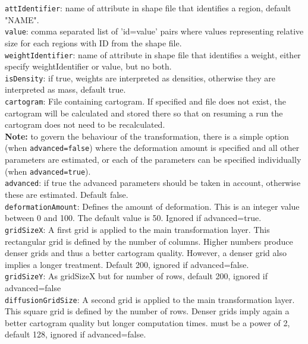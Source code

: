 \documentclass{article}
\begin{document}
{\tt attIdentifier}: name of attribute in shape file that identifies a region, default "NAME".\\

{\tt value}: comma separated list of 'id=value' pairs where values representing relative size for each regions with ID from the shape file.\\

{\tt weightIdentifier}: name of attribute in shape file that identifies a weight, either specify weightIdentifier or value, but no both.\\

{\tt isDensity}: if true, weights are interpreted as densities, otherwise they are interpreted as mass, default true.\\

{\tt cartogram}: File containing cartogram. If specified and file does not exist, the cartogram will be calculated and stored there so that on resuming a run the cartogram does not need to be recalculated.\\

{\bf Note:} to govern the behaviour of the transformation, there is a simple option (when {\tt advanced=false}) where the deformation amount is specified and all other parameters are estimated, or each of the parameters can be specified individually (when {\tt advanced=true}).\\

{\tt advanced}: if true the advanced parameters should be taken in account, otherwise these are estimated. Default false.\\

{\tt deformationAmount}: Defines the amount of deformation. This is an integer value between 0 and 100. The default value is 50. Ignored if advanced=true.\\

{\tt gridSizeX}: A first grid is applied to the main transformation layer. 
This rectangular grid is defined by the number of columns. 
Higher numbers produce denser grids and thus a better cartogram quality. 
However, a denser grid also implies a longer treatment. 
Default 200, ignored if advanced=false.\\

{\tt gridSizeY}: As gridSizeX but for number of rows, default 200, ignored if advanced=false\\

{\tt diffusionGridSize}: A second grid is applied to the main transformation layer. 
This square grid is defined by the number of rows. 
Denser grids imply again a better cartogram quality but longer computation times.
must be a power of 2, default 128, ignored if advanced=false.\\
\end{document}
